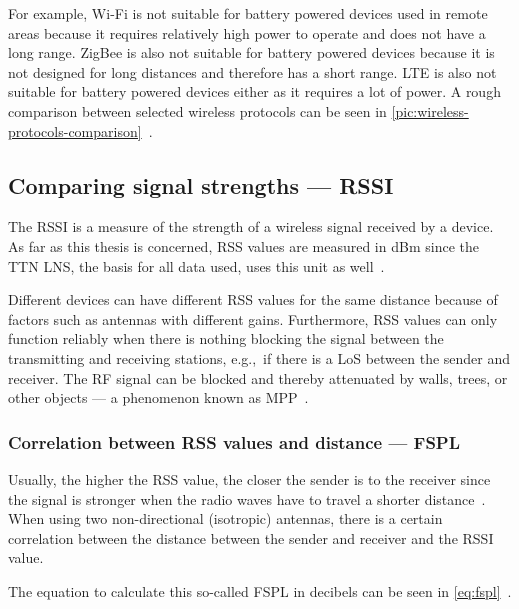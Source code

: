 For example, Wi-Fi is not suitable for battery powered devices used in remote areas because it requires relatively high power to operate and does not have a long range.
ZigBee is also not suitable for battery powered devices because it is not designed for long distances and therefore has a short range.
\ac{LTE} is also not suitable for battery powered devices either as it requires a lot of power.
A rough comparison between selected wireless protocols can be seen in \cref{pic:wireless-protocols-comparison}~\cite{wang_comparison_2021}.

\subsection{Comparing signal strengths — \acl{RSSI}}\label{sec:rssi}

The \acf{RSSI} is a measure of the strength of a wireless signal received by a device.
As far as this thesis is concerned, \ac{RSS} values are measured in dBm since the \ac{TTN} \ac{LNS}, the basis for all data used, uses this unit as well~\cite{the_things_industries_bv_data_2023}.

Different devices can have different \ac{RSS} values for the same distance because of factors such as antennas with different gains.
Furthermore, \ac{RSS} values can only function reliably when there is nothing blocking the signal between the transmitting and receiving stations, e.g.,\ if there is a \acl{LoS} between the sender and receiver.
The \ac{RF} signal can be blocked and thereby attenuated by walls, trees, or other objects --- a phenomenon known as \acf{MPP}~\cite{kucherov_investigation_2021}.

\subsubsection{Correlation between \acs{RSS} values and distance — \acf{FSPL}}\label{sec:background-free-space-path-loss}

Usually, the higher the \ac{RSS} value, the closer the sender is to the receiver since the signal is stronger when the radio waves have to travel a shorter distance~\cite{stutzman_antenna_1981}.
When using two non-directional (isotropic) antennas, there is a certain correlation between the distance between the sender and receiver and the \ac{RSSI} value.

The equation to calculate this so-called \acl{FSPL} in decibels can be seen in \cref{eq:fspl}~\cite[p. 1321]{whitaker_electronics_1996}.

